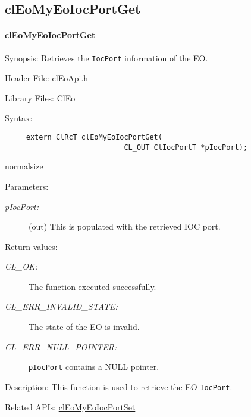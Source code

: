 \begin{flushleft}
  \newpage
\subsection{clEoMyEoIocPortGet}
\hypertarget{pageeo117}{}\paragraph{cl\-Eo\-My\-Eo\-Ioc\-Port\-Get}\label{pageeo117}
\begin{Desc}
\item[Synopsis:]Retrieves the {\tt{Ioc\-Port}} information of the EO.\end{Desc}
\begin{Desc}
\item[Header File:]clEoApi.h\end{Desc}
\begin{Desc}
\item[Library Files:]Cl\-Eo\end{Desc}
\begin{Desc}
\item[Syntax:]

\footnotesize\begin{verbatim}     extern ClRcT clEoMyEoIocPortGet(
                 			CL_OUT ClIocPortT *pIocPort);
\end{verbatim}
  normalsize
\end{Desc}
\begin{Desc}
\item[Parameters:]
\begin{description}
\item[{\em p\-Ioc\-Port:}](out) This is populated with the retrieved IOC port.\end{description}
\end{Desc}
\begin{Desc}
\item[Return values:]
\begin{description}
\item[{\em CL\_\-OK:}]The function executed successfully. 
\item[{\em CL\_\-ERR\_\-INVALID\_\-STATE:}]The state of the EO is invalid. 
\item[{\em CL\_\-ERR\_\-NULL\_\-POINTER:}]{\tt{pIocPort}} contains a NULL pointer.\end{description}
\end{Desc}
\begin{Desc}
\item[Description:]This function is used to retrieve the EO {\tt{Ioc\-Port}}.\end{Desc}
\begin{Desc}
\item[Related APIs:]\hyperlink{pageeo116}{cl\-Eo\-My\-Eo\-Ioc\-Port\-Set} \end{Desc}





\end{flushleft}
